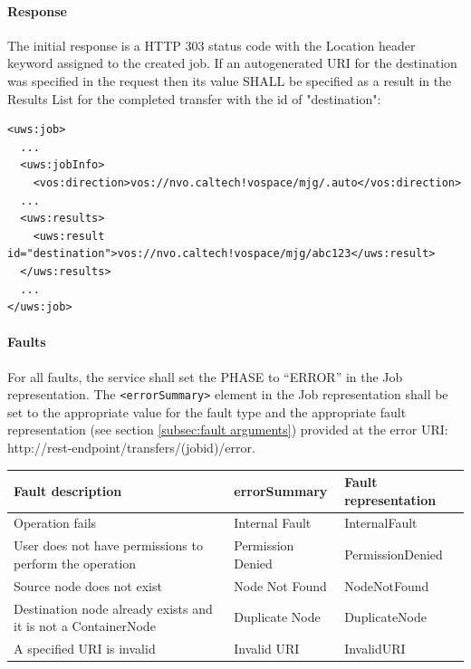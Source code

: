 \documentclass[11pt,a4paper]{ivoa}
\begin{document}
\paragraph{Response}
The initial response is a HTTP 303 status code with the Location header keyword assigned to the created job.
If an autogenerated URI for the destination was specified in the request then its value SHALL be specified as a result in the Results List for the completed transfer with the id of "destination":

\begin{lstlisting}
<uws:job>
  ...
  <uws:jobInfo>
    <vos:direction>vos://nvo.caltech!vospace/mjg/.auto</vos:direction>
  ...
  <uws:results>
    <uws:result id="destination">vos://nvo.caltech!vospace/mjg/abc123</uws:result>
  </uws:results>
  ...
</uws:job>
\end{lstlisting}

\paragraph{Faults}
For all faults, the service shall set the PHASE to ``ERROR'' in the Job representation. The \verb|<errorSummary>| element in the Job representation shall be set to the appropriate value for the fault type and the appropriate fault representation (see section \ref{subsec:fault arguments}) provided at the error URI: http://rest-endpoint/transfers/(jobid)/error.

\vspace{3mm}
\begin{tabular}{ p{5cm} l p{4cm} }
\textbf{Fault description} & \textbf{errorSummary} & \textbf{Fault representation} \\
\hline
Operation fails & Internal Fault & InternalFault \\
\hline
User does not have permissions to perform the operation & Permission Denied & PermissionDenied \\
\hline
Source node does not exist & Node Not Found & NodeNotFound \\
\hline
Destination node already exists and it is not a ContainerNode & Duplicate Node & DuplicateNode \\
\hline
A specified URI is invalid & Invalid URI & InvalidURI \\
\hline
\end{tabular}
\vspace{3mm}
\end{document}
